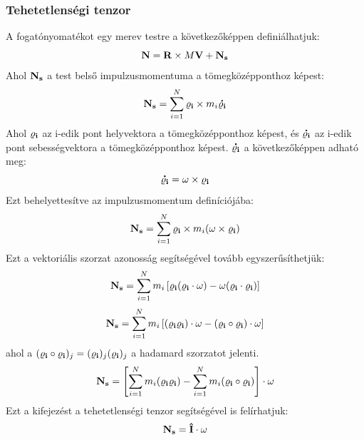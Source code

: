 \documentclass[../main.tex]{subfiles}
\begin{document}
\subsubsection{Tehetetlenségi tenzor}
A fogatónyomatékot egy merev testre a következőképpen definiálhatjuk:
\begin{equation}
    \bold{N} = \bold{R} \times M \bold{V} + \bold{N_s}
\end{equation}
Ahol $\bold{N_s}$ a test belső impulzusmomentuma a tömegközépponthoz képest:
\begin{equation}
    \bold{N_s} = \sum_{i=1}^{N} \bold{\varrho_i} \times m_i \bold{\dot{\varrho_i}}
\end{equation}
Ahol $\bold{\varrho_i}$ az i-edik pont helyvektora a tömegközépponthoz képest, és $\bold{\dot{\varrho_i}}$ az i-edik pont sebességvektora a tömegközépponthoz képest.
$\bold{\dot{\varrho_i}}$ a következőképpen adható meg:
\begin{equation}
    \bold{\dot{\varrho_i}} = \bold{\omega} \times \bold{\varrho_i}
\end{equation}
Ezt behelyettesítve az impulzusmomentum definíciójába:
\begin{equation}
    \bold{N_s} = \sum_{i=1}^{N} \bold{\varrho_i} \times m_i (\bold{\omega} \times \bold{\varrho_i})
\end{equation}
Ezt a vektoriális szorzat azonosság segítségével tovább egyszerűsíthetjük:
\begin{equation}
    \bold{N_s} = \sum_{i=1}^{N} m_i \left[\bold{\varrho_i} (\bold{\varrho_i} \cdot \bold{\omega}) - \bold{\omega} (\bold{\varrho_i} \cdot \bold{\varrho_i})\right]
\end{equation}
\begin{equation}
    \bold{N_s} = \sum_{i=1}^{N} m_i \left[(\bold{\varrho_i} \bold{\varrho_i}) \cdot \bold{\omega} - (\bold{\varrho_i} \circ \bold{\varrho_i}) \cdot \bold{\omega}\right]
\end{equation}
ahol a $(\bold{\varrho_i} \circ \bold{\varrho_i})_{j} = (\bold{\varrho_i})_{j} (\bold{\varrho_i})_{j}$ a hadamard szorzatot jelenti.
\begin{equation}
    \bold{N_s} = \left[\sum_{i=1}^{N} m_i (\bold{\varrho_i} \bold{\varrho_i}) - \sum_{i=1}^{N} m_i (\bold{\varrho_i} \circ \bold{\varrho_i})\right] \cdot \bold{\omega}
\end{equation}
Ezt a kifejezést a tehetetlenségi tenzor segítségével is felírhatjuk:
\begin{equation}
    \bold{N_s} = \bold{\hat{I}} \cdot \bold{\omega}
\end{equation}
\end{document}
